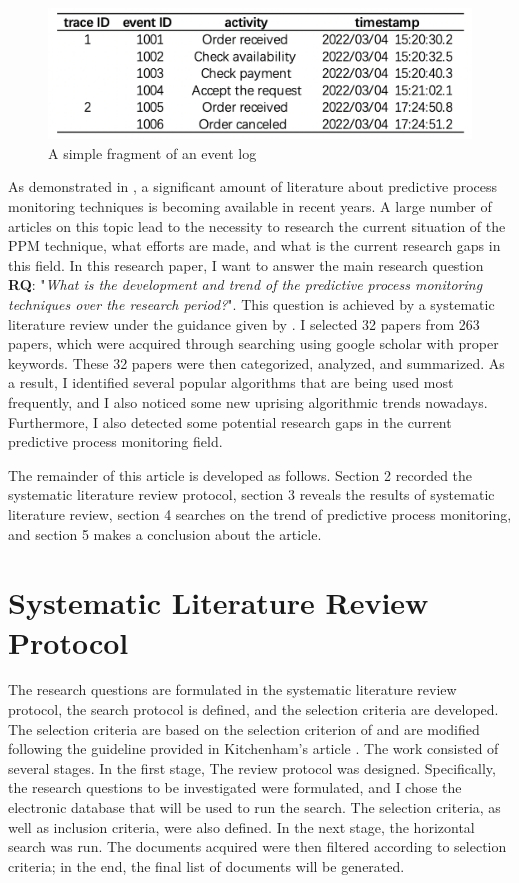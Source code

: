\documentclass[runningheads]{llncs}
\begin{document}
		\begin{figure}
		\includegraphics[scale=0.4]{event_logs.png}
		\centering
		\caption{A simple fragment of an event log} 
		\end{figure}
	
		As demonstrated in \cite{original}, a significant amount of literature about predictive process monitoring techniques is becoming available in recent years. A large number of articles on this topic lead to the necessity to research the current situation of the PPM technique, what efforts are made, and what is the current research gaps in this field.	In this research paper, I want to answer the main research question \textbf{RQ}: "\textit{What is the development and trend of the predictive process monitoring techniques over the research period?}". This question is achieved by a systematic literature review under the guidance given by \cite{guideline}. I selected 32 papers from 263 papers, which were acquired through searching using google scholar with proper keywords. These 32 papers were then categorized, analyzed, and summarized. As a result, I identified several popular algorithms that are being used most frequently, and I also noticed some new uprising algorithmic trends nowadays. Furthermore, I also detected some potential research gaps in the current predictive process monitoring field. 
	
		The remainder of this article is developed as follows. Section 2 recorded the systematic literature review protocol, section 3 reveals the results of systematic literature review, section 4 searches on the trend of predictive process monitoring, and section 5 makes a conclusion about the article. 
	
	\section{Systematic Literature Review Protocol}
		The research questions are formulated in the systematic literature review protocol, the search protocol is defined, and the selection criteria are developed. The selection criteria are based on the selection criterion of \cite{original} and are modified following the guideline provided in Kitchenham's article \cite{guideline}. The work consisted of several stages. In the first stage, The review protocol was designed. Specifically, the research questions to be investigated were formulated, and I chose the electronic database that will be used to run the search. The selection criteria, as well as inclusion criteria, were also defined. In the next stage, the horizontal search was run. The documents acquired were then filtered according to selection criteria; in the end, the final list of documents will be generated.
		
\end{document}
